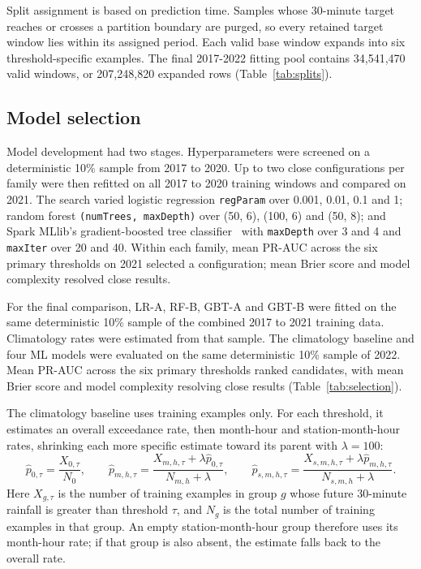 \documentclass[11pt,a4paper]{article}
\begin{document}
Split assignment is based on prediction time. Samples whose 30-minute target
reaches or crosses a partition boundary are purged, so every retained target
window lies within its assigned period. Each valid base window expands into
six threshold-specific examples. The final 2017-2022 fitting pool contains
34,541,470 valid windows, or 207,248,820 expanded rows
(Table~\ref{tab:splits}).

\subsection{Model selection}
Model development had two stages. Hyperparameters were screened on a
deterministic 10\% sample from 2017 to 2020. Up to two close configurations
per family were then refitted on all 2017 to 2020 training windows and
compared on 2021. The search varied logistic regression
\texttt{regParam} over 0.001, 0.01, 0.1 and 1; random forest
\texttt{(numTrees, maxDepth)} over (50, 6), (100, 6) and (50, 8); and
Spark MLlib's gradient-boosted tree classifier~\cite{spark-gbt} with
\texttt{maxDepth} over 3 and 4
and \texttt{maxIter} over 20 and 40. Within each family, mean PR-AUC across
the six primary thresholds on 2021 selected a configuration; mean Brier
score and model complexity resolved close results.

For the final comparison, LR-A, RF-B, GBT-A and GBT-B were fitted on the same
deterministic 10\% sample of the combined 2017 to 2021 training data.
Climatology rates were estimated from that sample. The climatology baseline
and four ML models were evaluated on the same deterministic 10\% sample of
2022. Mean PR-AUC across the six primary thresholds ranked candidates, with
mean Brier score and model complexity resolving close results
(Table~\ref{tab:selection}).

The climatology baseline uses training examples only. For each threshold,
it estimates an overall exceedance rate, then month-hour and
station-month-hour rates, shrinking each more specific estimate toward its
parent with $\lambda=100$:
\[
  \hat p_{0,\tau}=\frac{X_{0,\tau}}{N_0},\qquad
  \hat p_{m,h,\tau}=\frac{X_{m,h,\tau}+\lambda\hat p_{0,\tau}}{N_{m,h}+\lambda},\qquad
  \hat p_{s,m,h,\tau}=\frac{X_{s,m,h,\tau}+\lambda\hat p_{m,h,\tau}}{N_{s,m,h}+\lambda}.
\]
Here $X_{g,\tau}$ is the number of training examples in group $g$ whose
future 30-minute rainfall is greater than threshold $\tau$, and $N_g$ is the
total number of training examples in that group. An empty station-month-hour group
therefore uses its month-hour rate; if that group is also absent, the estimate
falls back to the overall rate.
\end{document}
